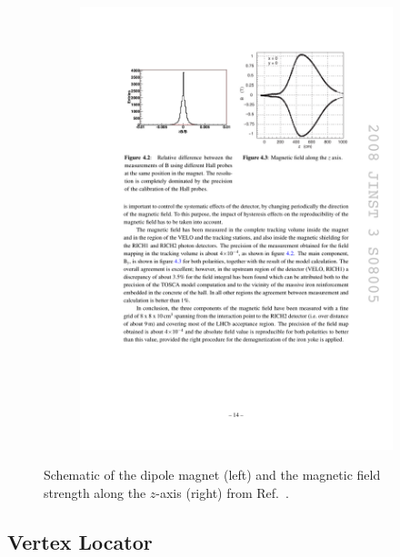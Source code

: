 \begin{figure}[!h]
\begin{subfigure}[t]{0.4\textwidth}
        \includegraphics[width=1.0\textwidth]{figs/Detector/magnet_B_field.pdf}
    \end{subfigure}
    \caption{Schematic of the \lhcb dipole magnet (left) and the magnetic field strength along the $z$-axis (right) from Ref.~\cite{Alves:2008zz}.}
    \label{fig:Dec_magnet}   
\end{figure}


\subsection{Vertex Locator}

